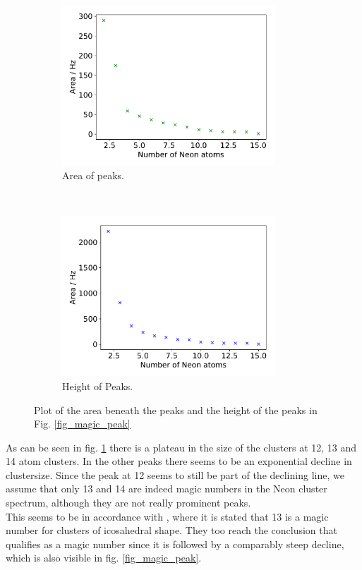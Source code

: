 \documentclass[a4paper,10pt]{article}
\begin{document}
\begin{figure}[H]
  \centering{}
  \begin{subfigure}[t]{0.45 \textwidth}
    \centering
    \includegraphics[height=6cm]{magic_area.pdf}
    \caption{Area of peaks.}
  \end{subfigure}
  ~
  \begin{subfigure}[t]{0.45 \textwidth}
    \centering
    \includegraphics[height=6cm]{magic_height.pdf}
    \caption{Height of Peaks. }
  \end{subfigure}
  \caption{Plot of the area beneath the peaks and the height of the peaks in Fig. \ref{fig_magic_peak}}
  \label{fig_magic_simple}
\end{figure}
As can be seen in fig. \ref{fig_magic_simple} there is a plateau in the size of the clusters at 12, 13 and 14 atom clusters. In the other peaks there seems to be an exponential decline in clustersize. Since the peak at 12 seems to still be part of the declining line, we assume that only 13 and 14 are indeed magic numbers in the Neon cluster spectrum, although they are not really prominent peaks. \\
This seems to be in accordance with \cite{paper_scheier}, where it is stated that 13 is a magic number for clusters of icosahedral shape. They too reach the conclusion that  qualifies as a magic number since it is followed by a comparably steep decline, which is also visible in fig. \ref{fig_magic_peak}.
\end{document}
